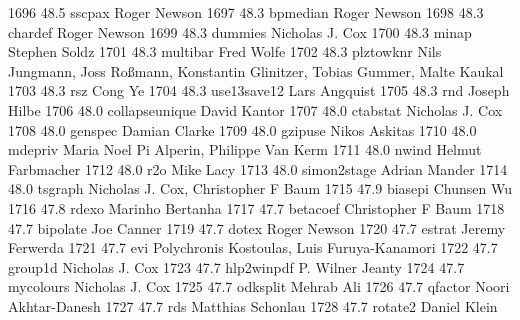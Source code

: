   1696     48.5    sscpax        Roger Newson                            
  1697     48.3    bpmedian      Roger Newson                            
  1698     48.3    chardef       Roger Newson                            
  1699     48.3    dummies       Nicholas J. Cox                         
  1700     48.3    minap         Stephen Soldz                           
  1701     48.3    multibar      Fred Wolfe                              
  1702     48.3    plztowknr     Nils Jungmann, Joss Roßmann,           
                                   Konstantin Glinitzer, Tobias Gummer,    
                                   Malte Kaukal                            
  1703     48.3    rsz           Cong Ye                                 
  1704     48.3    use13save12   Lars Angquist                           
  1705     48.3    rnd           Joseph Hilbe                            
  1706     48.0    collapseunique  David Kantor                            
  1707     48.0    ctabstat      Nicholas J. Cox                         
  1708     48.0    genspec       Damian Clarke                           
  1709     48.0    gzipuse       Nikos Askitas                           
  1710     48.0    mdepriv       Maria Noel Pi Alperin, Philippe Van Kerm
  1711     48.0    nwind         Helmut Farbmacher                       
  1712     48.0    r2o           Mike Lacy                               
  1713     48.0    simon2stage   Adrian Mander                           
  1714     48.0    tsgraph       Nicholas J. Cox, Christopher F Baum     
  1715     47.9    biasepi       Chunsen Wu                              
  1716     47.8    rdexo         Marinho Bertanha                        
  1717     47.7    betacoef      Christopher F Baum                      
  1718     47.7    bipolate      Joe Canner                              
  1719     47.7    dotex         Roger Newson                            
  1720     47.7    estrat        Jeremy Ferwerda                         
  1721     47.7    evi           Polychronis Kostoulas, Luis             
                                   Furuya-Kanamori                         
  1722     47.7    group1d       Nicholas J. Cox                         
  1723     47.7    hlp2winpdf    P. Wilner Jeanty                        
  1724     47.7    mycolours     Nicholas J. Cox                         
  1725     47.7    odksplit      Mehrab Ali                              
  1726     47.7    qfactor       Noori Akhtar-Danesh                     
  1727     47.7    rds           Matthias Schonlau                       
  1728     47.7    rotate2       Daniel Klein                            
